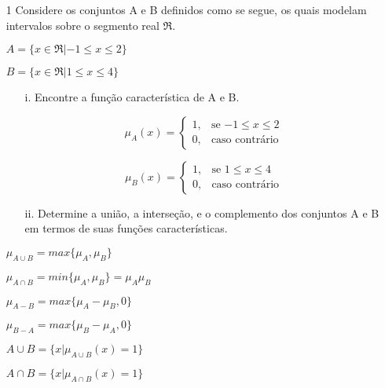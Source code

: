 \documentclass{report}
\begin{document}
\newpage

\begin{enumerate}

\item[1] Considere os conjuntos A e B definidos como se segue, os quais modelam intervalos sobre o segmento real $\Re$.

$A = \{x \in \Re | -1 \leq x \leq 2\}$

$B = \{x \in \Re |  1 \leq x \leq 4\}$ 
\begin{enumerate}

\item[i.] Encontre a função característica de A e B.

\begin{equation*}
\mu_A (x) = 
\begin{cases} 
1, & \text{se $-1 \leq x \leq 2$}
\\
0, &\text{caso contrário}
\end{cases}
\end{equation*}

\begin{equation*}
\mu_B (x) = 
\begin{cases} 
1, & \text{se $1 \leq x \leq 4$}
\\
0, &\text{caso contrário}
\end{cases}
\end{equation*}


\item[ii.] Determine a união, a interseção, e o complemento dos conjuntos A e B em termos de suas funções características.
\end{enumerate}

$\mu_{A \cup B} = max \lbrace\mu_A, \mu_B\rbrace$

$\mu_{A \cap B} = min \lbrace \mu_A, \mu_B   \rbrace  = \mu_A \mu_B $

$\mu_{A - B}    = max \lbrace \mu_A - \mu_B, 0 \rbrace   $

$\mu_{B - A}    = max \lbrace \mu_B - \mu_A, 0 \rbrace   $

$A \cup B = \lbrace x \vert \mu_{A \cup B }(x) = 1 \rbrace$

$A \cap B = \lbrace x \vert \mu_{A \cap B }(x) = 1 \rbrace$


\end{enumerate}
\end{document}
